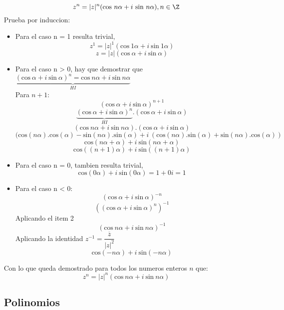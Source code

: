 \documentclass[10pt]{article}
\begin{document}
\newpage
\begin{prf}{}
	$$z^n = |z|^n (\text{cos}\ n\alpha + i\ \text{sin}\ n\alpha), n \in \Z$$
	Prueba por induccion:\\
	\begin{itemize}

	\item Para el caso n = 1 resulta trivial,
	$$ z^1 = |z|^1 (\text{cos}\ 1\alpha + i\ \text{sin}\ 1\alpha) $$
	$$ z = |z| (\text{cos}\ \alpha + i\ \text{sin}\ \alpha)$$

	\item Para el caso n > 0, hay que demostrar que $\underbrace{(\text{cos}\ \alpha + i\ \text{sin}\ \alpha)^n = \text{cos}\ n\alpha + i\ \text{sin}\ n\alpha}_{HI}$\\
	Para $n+1$:
	$$ (\text{cos}\ \alpha + i\ \text{sin}\ \alpha)^{n+1} $$
	$$ \underbrace{(\text{cos}\ \alpha + i\ \text{sin}\ \alpha)^n}_{HI} . (\text{cos}\ \alpha + i\ \text{sin}\ \alpha) $$
	$$ (\text{cos}\ n\alpha + i\ \text{sin}\ n\alpha) . (\text{cos}\ \alpha + i\ \text{sin}\ \alpha) $$
	$$ (\text{cos}(n\alpha).\text{cos}(\alpha) - \text{sin}(n\alpha).\text{sin}(\alpha) + i\ (\text{cos}(n\alpha).\text{sin}(\alpha) + \text{sin}(n\alpha).\text{cos}(\alpha)) $$
	$$ \text{cos}(n\alpha + \alpha) + i\ \text{sin}(n\alpha + \alpha) $$
	$$ \text{cos}((n + 1)\alpha) + i\ \text{sin}((n + 1)\alpha) $$

	\item Para el caso n = 0, tambien resulta trivial,
	$$ \text{cos}(0\alpha) + i\ \text{sin}(0\alpha) = 1 + 0i = 1 $$

	\item Para el caso n < 0:
	$$ (\text{cos}\ \alpha + i\ \text{sin}\ \alpha)^{-n} $$
	$$ \left((\text{cos}\ \alpha + i\ \text{sin}\ \alpha)^n\right)^{-1} $$
	\hfill Aplicando el item 2
	$$ (\text{cos}\ n\alpha + i\ \text{sin}\ n\alpha)^{-1} $$
	\hfill Aplicando la identidad $z^{-1} = \dfrac{\overline{z}}{|z|^2}$
	$$ \text{cos}(-n\alpha) + i\ \text{sin}(-n\alpha) $$
	\end{itemize}
	Con lo que queda demostrado para todos los numeros enteros $n$ que:
	$$z^n = |z|^n (\text{cos}\ n\alpha + i\ \text{sin}\ n\alpha)$$
\end{prf}


\subsection{Polinomios}
\end{document}
